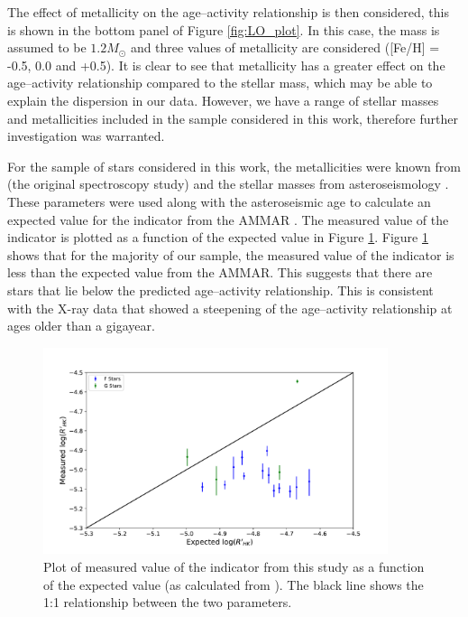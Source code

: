 The effect of metallicity on the age--activity relationship is then considered, this is shown in the bottom panel of Figure \ref{fig:LO_plot}. In this case, the mass is assumed to be $1.2 M_{\odot}$ and three values of metallicity are considered ([Fe/H] = -0.5, 0.0 and +0.5). It is clear to see that metallicity has a greater effect on the age--activity relationship compared to the stellar mass, which may be able to explain the dispersion in our data. However, we have a range of stellar masses and metallicities included in the sample considered in this work, therefore further investigation was warranted.

For the sample of stars considered in this work, the metallicities were known from \citet{Bruntt_etal_2012} (the original spectroscopy study) and the stellar masses from asteroseismology \citep{Chaplin_etal_2014,Silva_Aguirre_etal_2017}. These parameters were used along with the asteroseismic age to calculate an expected value for the \Rprime indicator from the AMMAR \citep{Lorenzo_Oliveira_etal_2016}. The measured value of the \Rprime indicator is plotted as a function of the expected value in Figure \ref{fig:Rprime_measured_v_expected}. Figure \ref{fig:Rprime_measured_v_expected} shows that for the majority of our sample, the measured value of the \Rprime indicator is less than the expected value from the AMMAR. This suggests that there are stars that lie below the predicted age--activity relationship. This is consistent with the X-ray data \citep{Booth_etal_2017} that showed a steepening of the age--activity relationship at ages older than a gigayear.

\begin{figure}
    \centering
    \includegraphics[width=0.9\textwidth]{Figures/4-Chromospheric_age/rhk_measured_v_expected.pdf}
    \caption[Measured \Rprime as a function of the expected value including mass and metallicity]{Plot of measured value of the \Rprime indicator from this study as a function of the expected value (as calculated from \citealt{Lorenzo_Oliveira_etal_2016}). The black line shows the 1:1 relationship between the two parameters.}
    \label{fig:Rprime_measured_v_expected}
\end{figure}

